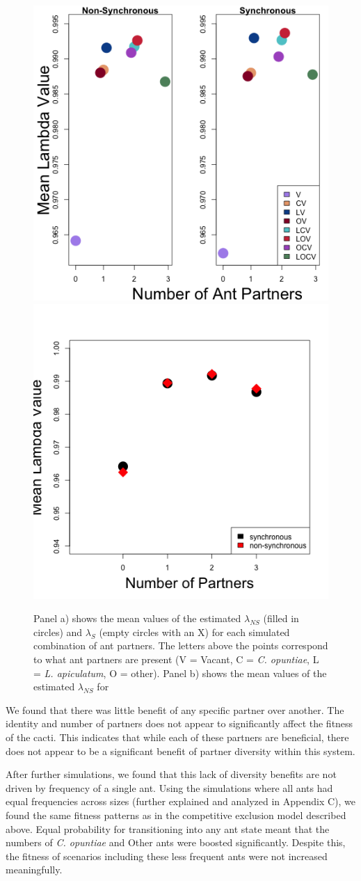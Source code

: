 \documentclass[11pt]{article}
\begin{document}
\begin{figure}
	\includegraphics[width=0.61\linewidth]{Figures/Lambdas_comp.png}
	\includegraphics[width=0.39\linewidth]{Figures/comp_num_partners.png}
	\caption{Panel a) shows the mean values of the estimated $\lambda_{NS}$ (filled in circles) and $\lambda_{S}$ (empty circles with an X) for each simulated combination of ant partners. The letters above the points correspond to what ant partners are present (V = Vacant, C = \textit{C. opuntiae}, L = \textit{L. apiculatum}, O = other). Panel b) shows the mean values of the estimated $\lambda_{NS}$ for }
	\label{fig:LambdaMeans}
\end{figure}

We found that there was little benefit of any specific partner over another.
The identity and number of partners does not appear to significantly affect the fitness of the cacti. 
This indicates that while each of these partners are beneficial, there does not appear to be a significant benefit of partner diversity within this system. 

After further simulations, we found that this lack of diversity benefits are not driven by frequency of a single ant. 
Using the simulations where all ants had equal frequencies across sizes (further explained and analyzed in Appendix C), we found the same fitness patterns as in the competitive exclusion model described above.
Equal probability for transitioning into any ant state meant that the numbers of \textit{C. opuntiae} and Other ants were boosted significantly.
Despite this, the fitness of scenarios including these less frequent ants were not increased meaningfully.
\end{document}
